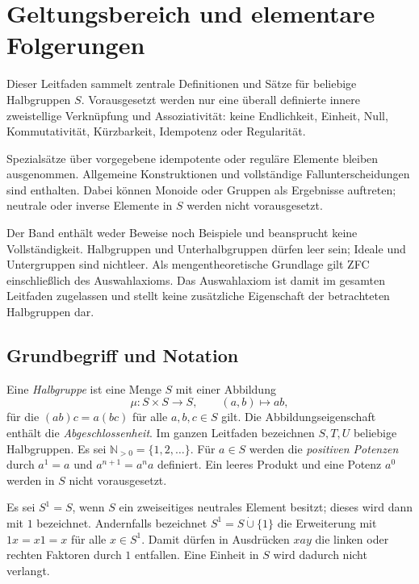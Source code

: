 \chapter{Geltungsbereich und elementare Folgerungen}

Dieser Leitfaden sammelt zentrale Definitionen und Sätze für beliebige
Halbgruppen $S$. Vorausgesetzt werden nur eine überall definierte innere
zweistellige Verknüpfung und Assoziativität: keine Endlichkeit, Einheit,
Null, Kommutativität, Kürzbarkeit, Idempotenz oder Regularität.

Spezialsätze über vorgegebene idempotente oder reguläre Elemente bleiben
ausgenommen. Allgemeine Konstruktionen und vollständige Fallunterscheidungen
sind enthalten. Dabei können Monoide oder Gruppen als Ergebnisse auftreten;
neutrale oder inverse Elemente in $S$ werden nicht vorausgesetzt.

Der Band enthält weder Beweise noch Beispiele und beansprucht keine
Vollständigkeit. Halbgruppen und Unterhalbgruppen dürfen leer sein;
Ideale und Untergruppen sind nichtleer. Als mengentheoretische
Grundlage gilt ZFC einschließlich des Auswahlaxioms. Das Auswahlaxiom
ist damit im gesamten Leitfaden zugelassen und stellt keine zusätzliche
Eigenschaft der betrachteten Halbgruppen dar.

\section{Grundbegriff und Notation}

\begin{definition}
Eine \emph{Halbgruppe} ist eine Menge $S$ mit einer Abbildung
\[
 \mu:S\times S\longrightarrow S,\qquad (a,b)\longmapsto ab,
\]
für die $(ab)c=a(bc)$ für alle $a,b,c\in S$ gilt.
Die Abbildungseigenschaft enthält die \emph{Abgeschlossenheit}.
Im ganzen Leitfaden bezeichnen $S,T,U$ beliebige Halbgruppen.
Es sei $\mathbb N_{>0}=\{1,2,\ldots\}$.
Für $a\in S$ werden die \emph{positiven Potenzen} durch
$a^1=a$ und $a^{n+1}=a^na$ definiert.
Ein leeres Produkt und eine Potenz $a^0$ werden in $S$ nicht vorausgesetzt.
\end{definition}

\begin{definition}
\label{b28guide:def:unit}
Es sei $S^1=S$, wenn $S$ ein zweiseitiges neutrales Element besitzt;
dieses wird dann mit $1$ bezeichnet.
Andernfalls bezeichnet $S^1=S\mathbin{\dot\cup}\{1\}$ die Erweiterung
mit $1x=x1=x$ für alle $x\in S^1$.
Damit dürfen in Ausdrücken $xay$ die linken oder rechten Faktoren
durch $1$ entfallen. Eine Einheit in $S$ wird dadurch nicht verlangt.
\end{definition}

